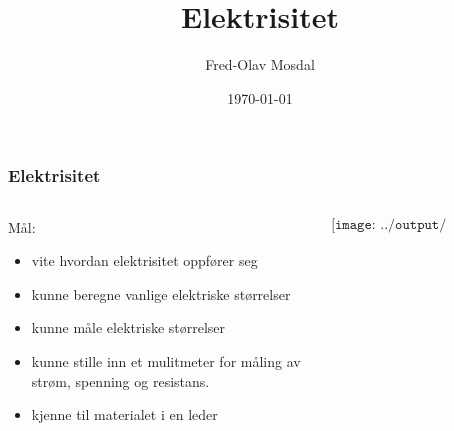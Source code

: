 \documentclass[aspectratio=169,xcolor=dvipsnames]{beamer}
\title[Elektrisitet]{Elektrisitet} %
\author[Fred-Olav] {Fred-Olav Mosdal}
\institute[Gand VGS] %
{
    Gand VGS \\
    VG1 TIF }
\date{\today} %
\begin{document}
\begin{frame}
\titlepage
\end{frame}




\begin{frame}
	\frametitle{Elektrisitet}

	\begin{columns}
		\begin{column}{0.5\textwidth}
			Mål:
			\begin{itemize}
				\item vite hvordan elektrisitet oppfører seg
				\item kunne beregne vanlige elektriske størrelser
				\item kunne måle elektriske størrelser
				\item kunne stille inn et mulitmeter for måling av strøm, spenning og resistans. 
				\item kjenne til materialet i en leder
			\end{itemize}
		\end{column}

		\begin{column}{0.5\textwidth}
			$$\texttt{[image: ../output/noGPLimages/tifel01.png]}$$
		\end{column}
	\end{columns}
\end{frame}
\end{document}
